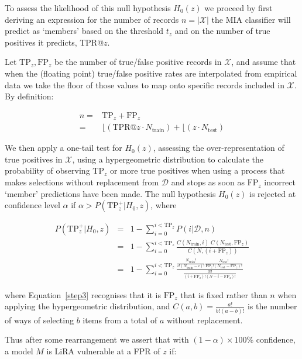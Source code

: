 To assess the likelihood of this null hypothesis $H_0(z)$ we proceed by first deriving an expression for the number of records $n=|\mathcal{X}|$ the MIA classifier will predict as `members' based on the threshold $t_z$ and on the number of true positives it predicts, TPR@$z$.

Let $\text{TP}_z, \text{FP}_z$ be the number of true/false positive records in $\mathcal{X}$, and assume that when the (floating point) true/false positive rates are interpolated from empirical data we take the floor of those values to map onto specific records included in $\mathcal{X}$. By definition:

\begin{eqnarray}
    n =&\text{TP}_z + \text{FP}_z \nonumber\\
    = & \lfloor(\text{TPR@}z \cdot N_{\text{train}}) + \lfloor (z \cdot N_{\text{test}}) \label{eqn:line-1}
\end{eqnarray}

We then apply a one-tail test for $H_0(z)$, assessing the over-representation of true positives in $\mathcal{X}$, using a hypergeometric distribution to calculate the probability of observing $\text{TP}_z$ or more true positives when using a process that makes selections without replacement from $\mathcal{D}$ and stops as soon as $\text{FP}_z$ incorrect `member' predictions have been made. The null hypothesis $H_0(z)$ is rejected at confidence level $\alpha$ if $\alpha > P(\text{TP}_z^+ | H_0, z)$, where

\begin{eqnarray}
    P(\text{TP}_z^+ | H_0, z) &=& 1 - \sum_{i=0}^{i<\text{TP}_z} P(i|\mathcal{D},n) \\
    &=& 1 - \sum_{i=0}^{i<\text{TP}_z} \frac{ C(N_{\text{train}},i)\; C(N_{\text{test}},\text{FP}_z)}{C(N,(i+\text{FP}_z))} \label{step3} \\
    &=& 1 - \sum_{i=0}^{i<\text{TP}_z} \frac{\frac{N_{\text{train}}!}{i!(N_{\text{train}}-i)!}\frac{N_{\text{test}}!}{\text{FP}_z! (N_{\text{test}}-\text{FP}_z)!}}{\frac{N!}{(i+\text{FP}_z)! (N - i - \text{FP}_z)!}} 
\end{eqnarray}

\noindent where Equation~\ref{step3} recognises that it is $\text{FP}_z$ that is fixed rather than $n$ when applying the hypergeometric distribution, and $C(a,b)= \frac{a!}{b!(a-b)!}$ is the number of ways of selecting $b$ items from a total of $a$ without replacement. 

Thus after some rearrangement we assert that with $(1-\alpha) \times 100$\% confidence, a model $M$ is LiRA vulnerable at a FPR of $z$ if:

